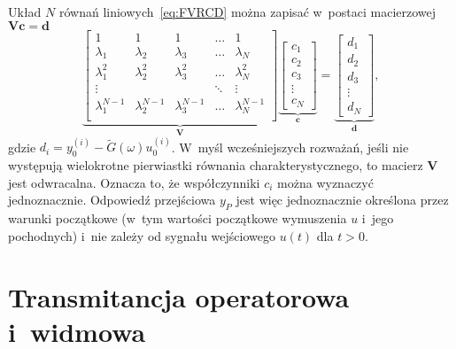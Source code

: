 \documentclass[paper=a4,DIV=12]{lpas}
\begin{document}
Układ $N$ równań liniowych~\eqref{eq:FVRCD} można zapisać w~postaci
macierzowej $\mathbf{V} \mathbf{c} = \mathbf{d}$
\begin{equation}
  \underbrace{\begin{bmatrix}
    1               & 1               & 1               & \dots & 1               \\
    \lambda_1       & \lambda_2       & \lambda_3       & \dots & \lambda_N       \\
    \lambda_1^2     & \lambda_2^2     & \lambda_3^2     & \dots & \lambda_N^2     \\
    \vdots          &                 &                 & \ddots& \vdots          \\
    \lambda_1^{N-1} & \lambda_2^{N-1} & \lambda_3^{N-1} & \dots & \lambda_N^{N-1} \\
  \end{bmatrix}}_{\mathbf{V}}
  \underbrace{\begin{bmatrix}
    c_1 \\ c_2 \\ c_3 \\ \vdots \\ c_N
  \end{bmatrix}}_{\mathbf{c}}
  =
  \underbrace{\begin{bmatrix}
    d_1 \\ d_2 \\ d_3 \\ \vdots \\ d_N
  \end{bmatrix}}_{\mathbf{d}},
\end{equation}
gdzie $d_i = y_0^{(i)} - \tilde{G}\left(\omega\right) u_0^{(i)}$. W~myśl
wcześniejszych rozważań, jeśli nie występują wielokrotne pierwiastki równania
charakterystycznego, to macierz $\mathbf{V}$ jest odwracalna. Oznacza to, że
współczynniki $c_i$ można wyznaczyć jednoznacznie. Odpowiedź przejściowa
$y_P$ jest więc jednoznacznie określona przez warunki początkowe (w~tym
wartości początkowe wymuszenia $u$ i~jego pochodnych) i~nie zależy od
sygnału wejściowego $u(t)$ dla $t > 0$.

\section{Transmitancja operatorowa i~widmowa}
\label{sec:2N6W7}
\end{document}
